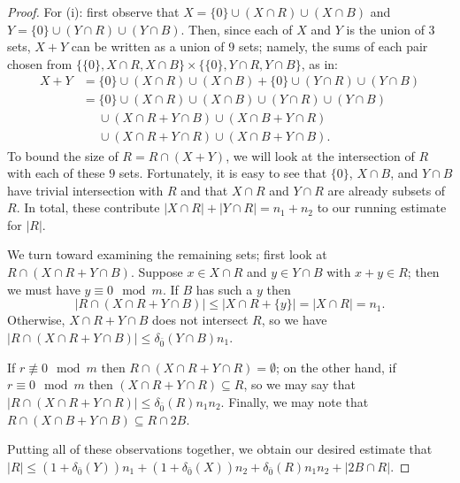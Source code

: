 \begin{proof}
For (i): first observe that $X = \{0\}\cup (X\cap R) \cup (X\cap B)$ and $Y = \{0\}\cup (Y\cap R) \cup (Y\cap B)$.
Then, since each of $X$ and $Y$ is the union of $3$ sets, $X+Y$ can be written as a union of $9$ sets; namely, the sums of each pair chosen from $\{\{0\}, X\cap R, X\cap B\} \times \{ \{0\}, Y\cap R, Y\cap B\}$, as in:
\begin{align*}
X+Y &= \{0\}\cup (X\cap R) \cup (X\cap B) + \{0\} \cup (Y\cap R) \cup (Y\cap B) \\
&= \{0\}\cup (X\cap R) \cup (X\cap B) \cup (Y\cap R) \cup (Y\cap B) \\
& \quad\; \cup (X\cap R + Y\cap B) \cup (X\cap B + Y\cap R)\\
& \quad\; \cup (X\cap R + Y\cap R) \cup (X\cap B + Y\cap B).
\end{align*}
To bound the size of $R = R\cap (X+Y)$, we will look at the intersection of $R$ with each of these $9$ sets.  
Fortunately, it is easy to see that $\{0\}$, $X\cap B$, and $Y\cap B$ have trivial intersection with $R$ and that $X\cap R$ and $Y\cap R$ are already subsets of $R$.
In total, these contribute $|X\cap R| + |Y\cap R| = n_1+n_2$ to our running estimate for $|R|$.

We turn toward examining the remaining sets; first look at $R \cap (X\cap R + Y\cap B)$.
Suppose $x\in X\cap R$ and $y\in Y\cap B$ with $x+y\in R$; then we must have $y\equiv 0 \mod m$.
If $B$ has such a $y$ then
\[|R\cap (X\cap R + Y\cap B)| \le |X\cap R + \{y\}| = |X\cap R|=n_1. \]
Otherwise, $X\cap R + Y\cap B$ does not intersect $R$, so we have $|R\cap (X\cap R + Y\cap B)| \le  \delta_{\bar{0}}(Y\cap B) n_1$.


If $r\not\equiv 0 \mod m$ then $R \cap (X\cap R + Y\cap R) =\emptyset$; on the other hand, if $r\equiv 0 \mod m$ then $(X\cap R+Y\cap R)\subseteq R$, so we may say that $|R\cap (X\cap R + Y\cap R)| \le \delta_{\bar{0}}(R) n_1n_2$.
Finally, we may note that $R\cap (X\cap B + Y\cap B) \subseteq R\cap 2B$.

Putting all of these observations together, we obtain our desired estimate that $|R| \le (1+\delta_{\bar{0}}(Y))n_1 + (1+\delta_{\bar{0}}(X))n_2 + \delta_{\bar{0}}(R)n_1n_2 + |2B \cap R|$.


\end{proof}
